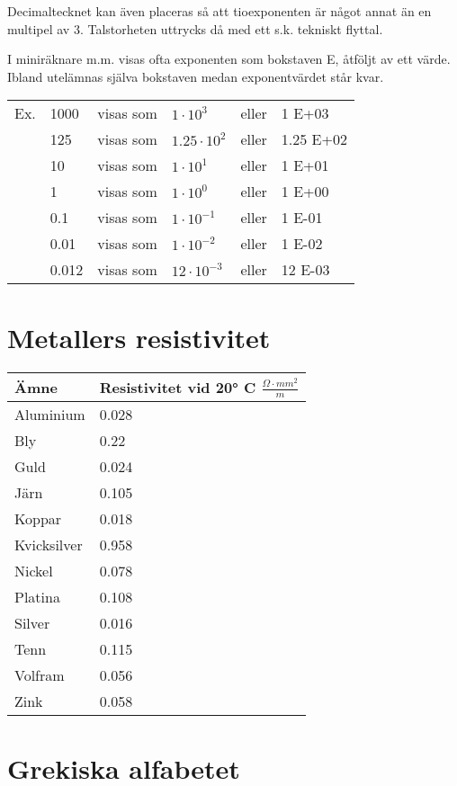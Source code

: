 Decimaltecknet kan även placeras så att tioexponenten är något annat
än en multipel av 3. Talstorheten uttrycks då med ett s.k. tekniskt
flyttal.

I miniräknare m.m. visas ofta exponenten som bokstaven E, åtföljt av
ett värde. Ibland utelämnas själva bokstaven medan exponentvärdet står
kvar.

\begin{tabular}{llllll}
  Ex. & 1000  & visas som & \(1    \cdot 10^3  \) & eller & 1 E+03 \\
      & 125   & visas som & \(1.25 \cdot 10^2  \) & eller & 1.25 E+02 \\
      & 10    & visas som & \(1    \cdot 10^1  \) & eller & 1 E+01 \\
      & 1     & visas som & \(1    \cdot 10^0  \) & eller & 1 E+00 \\
      & 0.1   & visas som & \(1    \cdot 10^{-1}\) & eller & 1 E-01 \\
      & 0.01  & visas som & \(1    \cdot 10^{-2}\) & eller & 1 E-02 \\
      & 0.012 & visas som & \(12   \cdot 10^{-3}\) & eller & 12 E-03 \\
\end{tabular}

\section{Metallers resistivitet}

\begin{tabular}{l|l}
  Ämne & Resistivitet vid 20° C \(\frac{Ω\cdot mm^2}{m}\) \\
  \hline
  Aluminium   & 0.028 \\
  Bly         & 0.22  \\
  Guld        & 0.024 \\
  Järn        & 0.105 \\
  Koppar      & 0.018 \\
  Kvicksilver & 0.958 \\
  Nickel      & 0.078 \\
  Platina     & 0.108 \\
  Silver      & 0.016 \\
  Tenn        & 0.115 \\
  Volfram     & 0.056 \\
  Zink        & 0.058 \\
\end{tabular}


\section{Grekiska alfabetet}

